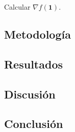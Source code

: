 \documentclass{article}
\begin{document}
Calcular $\nabla f(\mathbf{1})$.

\subsection{Metodología}

\subsection{Resultados}
\setcounter{equation}{0}

\subsection{Discusión}

\subsection{Conclusión}
\end{document}
